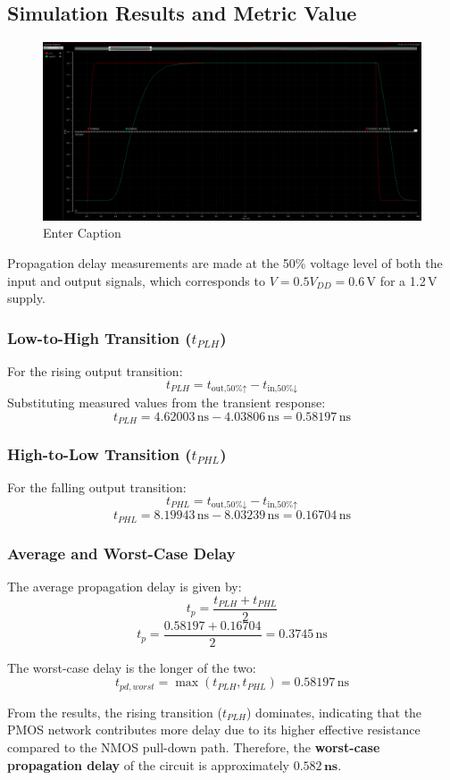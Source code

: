 \documentclass[12pt]{article}
\begin{document}
\subsection{Simulation Results and Metric Value}
\begin{figure}[H]
    \centering
    \includegraphics[width=0.5\linewidth]{writeup//figures/baseline_delay_transient.png}
    \caption{Enter Caption}
\end{figure}
Propagation delay measurements are made at the 50\% voltage level of both the input and output signals, which corresponds to \( V = 0.5V_{DD} = 0.6\,\text{V} \) for a 1.2\,V supply.

\subsubsection*{Low-to-High Transition (\(t_{PLH}\))}

For the rising output transition:
\[
t_{PLH} = t_{\text{out,50\%↑}} - t_{\text{in,50\%↓}}
\]
Substituting measured values from the transient response:
\[
t_{PLH} = 4.62003\,\text{ns} - 4.03806\,\text{ns} = 0.58197\,\text{ns}
\]

\subsubsection*{High-to-Low Transition (\(t_{PHL}\))}

For the falling output transition:
\[
t_{PHL} = t_{\text{out,50\%↓}} - t_{\text{in,50\%↑}}
\]
\[
t_{PHL} = 8.19943\,\text{ns} - 8.03239\,\text{ns} = 0.16704\,\text{ns}
\]

\subsubsection*{Average and Worst-Case Delay}

The average propagation delay is given by:
\[
t_p = \frac{t_{PLH} + t_{PHL}}{2}
\]
\[
t_p = \frac{0.58197 + 0.16704}{2} = 0.3745\,\text{ns}
\]

The worst-case delay is the longer of the two:
\[
t_{pd,worst} = \max(t_{PLH}, t_{PHL}) = 0.58197\,\text{ns}
\]

From the results, the rising transition (\(t_{PLH}\)) dominates, indicating that the PMOS network contributes more delay due to its higher effective resistance compared to the NMOS pull-down path. 
Therefore, the \textbf{worst-case propagation delay} of the circuit is approximately \(\mathbf{0.582\,ns}\).
\end{document}
